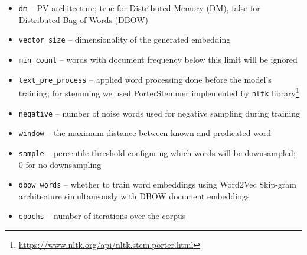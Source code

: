 \begin{itemize}

  \item \texttt{dm} --  PV architecture; true for Distributed Memory (DM),
    false for Distributed Bag of Words (DBOW)

  \item \texttt{vector\_size} -- dimensionality of the generated embedding

  \item \texttt{min\_count} -- words with document frequency below this limit
    will be ignored

  \item \texttt{text\_pre\_process} -- applied word processing done before the
    model's training; for stemming we used PorterStemmer implemented by
    \texttt{nltk}
    library\footnote{\url{https://www.nltk.org/api/nltk.stem.porter.html}}

  \item \texttt{negative} -- number of noise words used for negative sampling
    during training

  \item \texttt{window} -- the maximum distance between known and predicated
    word

  \item \texttt{sample} -- percentile threshold configuring which words will be
    downsampled; 0 for no downsampling


  \item \texttt{dbow\_words} -- whether to train word embeddings using
    Word2Vec \citep{mikolov2013efficient} Skip-gram architecture simultaneously
    with DBOW document embeddings

  \item \texttt{epochs} -- number of iterations over the corpus

\end{itemize}


